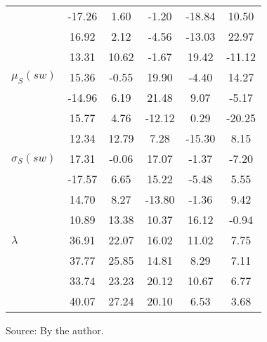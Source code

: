 \begin{table}[h!]
\begin{center}
\begin{tabular}{l || c | c | c | c | c}
 & -17.26  & 1.60  & -1.20  & -18.84  & 10.50 \\
 & 16.92  & 2.12  & -4.56  & -13.03  & 22.97 \\
 & 13.31  & 10.62  & -1.67  & 19.42  & -11.12 \\\hline
$\mu_S(sw)$ & 15.36  & -0.55  & 19.90  & -4.40  & 14.27 \\
 & -14.96  & 6.19  & 21.48  & 9.07  & -5.17 \\
 & 15.77  & 4.76  & -12.12  & 0.29  & -20.25 \\
 & 12.34  & 12.79  & 7.28  & -15.30  & 8.15 \\\hline
$\sigma_S(sw)$ & 17.31  & -0.06  & 17.07  & -1.37  & -7.20 \\
 & -17.57  & 6.65  & 15.22  & -5.48  & 5.55 \\
 & 14.70  & 8.27  & -13.80  & -1.36  & 9.42 \\
 & 10.89  & 13.38  & 10.37  & 16.12  & -0.94 \\\hline\hline
$\lambda$ & 36.91  & 22.07  & 16.02  & 11.02  & 7.75 \\
 & 37.77  & 25.85  & 14.81  & 8.29  & 7.11 \\
 & 33.74  & 23.23  & 20.12  & 10.67  & 6.77 \\
 & 40.07  & 27.24  & 20.10  & 6.53  & 3.68 \\\hline
\end{tabular}
\begin{flushleft}\footnotesize
		Source: By the author.\
\end{flushleft}
\end{center}
\end{table}
